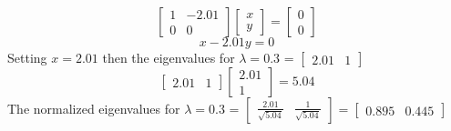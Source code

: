 \documentclass[12pt,a4paper]{paper}
\begin{document}
\begin{enumerate}
\begin{enumerate}
\begin{equation}
\left[\begin{array}{cc} 1 & -2.01 \\ 0 & 0\end{array}\right]\left[\begin{array}{c}x\\y\end{array}\right] = \left[\begin{array}{c}0\\0\end{array}\right]
\end{equation}
\begin{equation}
x - 2.01 y = 0
\end{equation}
Setting $x = 2.01$ then the eigenvalues for $\lambda = 0.3$ = $\left[\begin{array}{cc}2.01 &  1\end{array}\right]$
\begin{equation}
\left[\begin{array}{cc}2.01 &  1\end{array}\right]\left[\begin{array}{c}2.01 \\  1\end{array}\right] = 5.04
\end{equation}
The normalized eigenvalues for $\lambda = 0.3$ = $\left[\begin{array}{cc}\frac{2.01}{\sqrt{5.04}} &  \frac{1}{\sqrt{5.04}}\end{array}\right] = \left[\begin{array}{cc}0.895 & 0.445\end{array}\right]$


\end{enumerate}
\end{enumerate}
\end{document}
